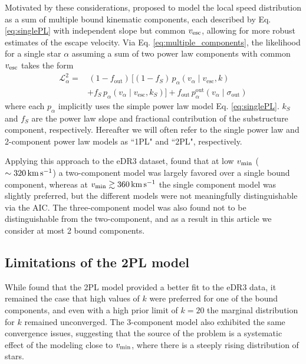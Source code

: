 Motivated by these considerations, \cite{Necib2022methods} proposed to model the local speed distribution as a sum of multiple bound kinematic components, each described by Eq. \ref{eq:singlePL} with independent slope but common $v_{\rm{esc}}$, allowing for more robust estimates of the escape velocity. Via Eq. \ref{eq:multiple_components}, the likelihood for a single star $\alpha$ assuming a sum of two power law components with common $v_{\rm{esc}}$ takes the form
\begin{equation}
    \begin{aligned}
    \mathcal{L}_\alpha^{2}=&\,(1-f_\mathrm{out})\, \big[(1-f_S)\, p_\alpha\left(v_\alpha \mid v_\mathrm{esc}, k\right) \\
    &+ f_S\, p_\alpha\left(v_\alpha \mid v_\mathrm{esc}, k_S\right)\big] +f_\mathrm{out} \,p_\alpha^{\mathrm{out}}\left(v_\alpha \mid \sigma_{\mathrm{out}}\right)
    \end{aligned}
\end{equation}
where each $p_\alpha$ implicitly uses the simple power law model Eq. \ref{eq:singlePL}. $k_{S}$ and $f_S$ are the power law slope and fractional contribution of the substructure component, respectively. Hereafter we will often refer to the single power law and 2-component power law models as ``1PL" and ``2PL", respectively. 

Applying this approach to the \Gaia eDR3 dataset, \cite{Necib2022} found that at low $v_{\rm{min}}$ ($\sim 320\,\rm{km\,s^{-1}}$) a two-component model was largely favored over a single bound component, whereas at $v_{\rm{min}}\gtrsim 360\,\rm{km\,s^{-1}}$ the single component model was slightly preferred, but the different models were not meaningfully distinguishable via the AIC. The three-component model was also found not to be distinguishable from the two-component, and as a result in this article we consider at most 2 bound components. 

\subsection{Limitations of the 2PL model}
\label{sec:limitations_2pl}

While \cite{Necib2022} found that the 2PL model provided a better fit to the \Gaia eDR3 data, it remained the case that high values of $k$ were preferred for one of the bound components, and even with a high prior limit of $k = 20$ the marginal distribution for $k$ remained unconverged. The 3-component model also exhibited the same convergence issues, suggesting that the source of the problem is a systematic effect of the modeling close to $v_{\rm{min}}$, where there is a steeply rising distribution of stars. 

